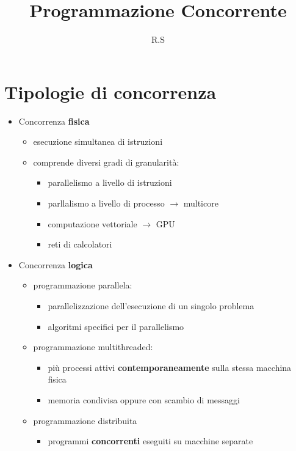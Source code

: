 \documentclass[12pt]{extarticle}
\title{Programmazione Concorrente}
\author{R.S}
\begin{document}
\maketitle

\section*{Tipologie di concorrenza}

\begin{itemize}
    \item Concorrenza \textbf{fisica}
    \begin{itemize}
        \item esecuzione simultanea di istruzioni
        \item comprende diversi gradi di granularità:
        \begin{itemize}
            \item parallelismo a livello di istruzioni
            \item parllalismo a livello di processo $\rightarrow$ multicore
            \item computazione vettoriale $\rightarrow$ GPU
            \item reti di calcolatori
        \end{itemize}
    \end{itemize}
    \item Concorrenza \textbf{logica}
    \begin{itemize}
        \item programmazione parallela:
        \begin{itemize}
            \item parallelizzazione dell'esecuzione di un singolo problema 
            \item algoritmi specifici per il parallelismo
        \end{itemize}
        \item programmazione multithreaded:
        \begin{itemize}
            \item più processi attivi \textbf{contemporaneamente} sulla stessa macchina fisica
            \item memoria condivisa oppure con scambio di messaggi 
        \end{itemize}
        \item programmazione distribuita
        \begin{itemize}
            \item programmi \textbf{concorrenti} eseguiti su macchine separate

\end{itemize}
\end{itemize}
\end{itemize}
\end{document}
